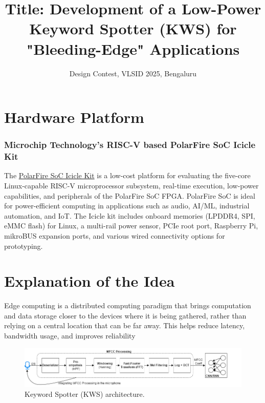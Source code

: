 \documentclass[12pt,twoside]{article}
\title{Title: Development of a Low-Power Keyword Spotter (KWS) for "Bleeding-Edge" Applications}
\author{Design Contest, VLSID 2025, Bengaluru}
\begin{document}
\maketitle

\begin{abstract}

\end{abstract}

\section{Hardware Platform}

\subsubsection*{Microchip Technology’s RISC-V based PolarFire SoC Icicle Kit}

The \href{https://www.microchip.com/en-us/development-tool/mpfs-icicle-kit-es}{PolarFire SoC Icicle Kit} is a low-cost platform for evaluating the five-core Linux-capable RISC-V microprocessor subsystem, real-time execution, low-power capabilities, and peripherals of the PolarFire SoC FPGA. PolarFire SoC is ideal for power-efficient computing in applications such as audio, AI/ML, industrial automation, and IoT. The Icicle kit includes onboard memories (LPDDR4, SPI, eMMC flash) for Linux, a multi-rail power sensor, PCIe root port, Raspberry Pi, mikroBUS expansion ports, and various wired connectivity options for prototyping.


\section{Explanation of the Idea}

Edge computing is a distributed computing paradigm that brings computation and data storage closer to the devices where it is being gathered, rather than relying on a central location that can be far away. This helps reduce latency, bandwidth usage, and improves reliability

\begin{figure}[htbp]	
    \includegraphics[width=1.0\textwidth]{figs/KWS-arch.png}
    \caption{Keyword Spotter (KWS) architecture.}
    \label{fig:KWS_Arch}
\end{figure}
\end{document}
